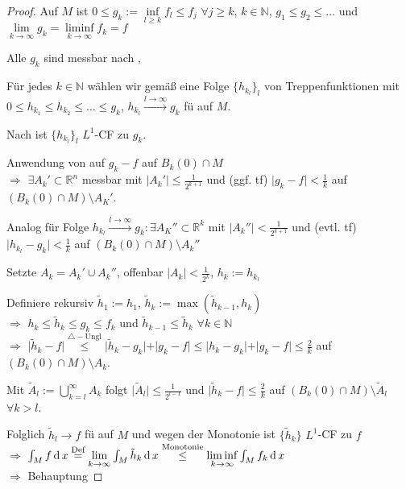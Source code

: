 \begin{proof}
	Auf $M$ ist $0\le g_k := \inf\limits_{l\ge k} f_l \le f_j$ $\forall j\ge k$, $k\in\mathbb{N}$, $g_1 \le g_2 \le \dotsc$ und $\lim\limits_{k\to\infty} g_k = \liminf\limits_{k\to\infty} f_k = f$
	
	Alle $g_k$ sind messbar nach , 
	
	Für jedes $k\in\mathbb{N}$ wählen wir gemäß  eine Folge $\{ h_{k_l} \}_l$ von Treppenfunktionen mit $0\le h_{k_1} \le h_{k_2} \le \dotsc \le g_k$, $h_{k_l}\xrightarrow{l\to\infty} g_k$ \gls{fü} auf $M$.
	
	Nach  ist $\{ h_{k_l}\}_l$ $L^1$-CF zu $g_k$.
	
	Anwendung von  auf $g_k - f$ auf $B_k(0)\cap M$ \\
	$\Rightarrow$ $\exists A_k' \subset\mathbb{R}^n$ messbar mit $\vert A_k'\vert \le \frac{1}{2^{k+1}}$ und (ggf. \gls{tf}) $\vert g_k - f\vert < \frac{1}{k}$ auf $(B_k(0) \cap M)\setminus A_K'$.
	
	Analog für Folge $h_{k_l}\xrightarrow{l\to\infty} g_k: \exists A_K''\subset\mathbb{R}^k$ mit $\vert A_k''\vert < \frac{1}{2^{k+1}}$ und (evtl. \gls{tf}) $\vert h_{k_l} - g_k \vert < \frac{1}{k}$ auf $(B_k(0)\cap M)\setminus A_k''$
	
	Setzte $A_k = A_k'\cup A_k''$, offenbar $\vert A_k\vert < \frac{1}{2^k}$, $h_k := h_{k_l}$
	
	Definiere rekursiv $\tilde{h}_1 := h_1$, $\tilde{h}_k := \max( \tilde{h}_{k-1}, h_k)$ \\
	$\Rightarrow$ $h_k \le \tilde{h}_k \le g_k \le f_k$ und $\tilde{h}_{k-1} \le \tilde{h}_k$ $\forall k\in\mathbb{N}$ \\
	$\Rightarrow$ $\vert \tilde{h}_k - f\vert \overset{\triangle-\text{Ungl}}{\le}\vert \tilde{h}_k - g_k\vert + \vert g_k -f \vert \le \vert h_k - g_k\vert + \vert g_k -f \vert \le \frac{2}{k}$ auf $(B_k(0)\cap M)\setminus A_k$.
	
	Mit $\tilde{A}_l := \bigcup_{k=l}^\infty A_k$ folgt $\vert \tilde{A}_l\vert \le \frac{1}{2^{l-1}}$ und $\vert \tilde{h}_k - f \vert \le \frac{2}{k}$ auf $(B_k(0)\cap M)\setminus \tilde{A}_l$ $\forall k>l$.
	
	Folglich $\tilde{h}_l\to f$ \gls{fü} auf $M$ und wegen der Monotonie ist $\{ \tilde{h}_k\}$ $L^1$-CF zu $f$ \\
	$\Rightarrow$ $\int_M f \operatorname{d} x \overset{\text{Def}}{=} \lim\limits_{k\to\infty} \int_M \tilde{h}_k \operatorname{d} x \overset{\text{Monotonie}}{\le}\liminf\limits_{k\to\infty} \int_M f_k \operatorname{d} x$\\
	$\Rightarrow$ Behauptung
\end{proof}


